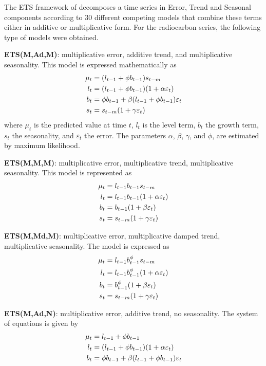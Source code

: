 \documentclass[draft,grl]{agutexSI}
\begin{document}
\begin{article}


The ETS framework of \citet{Hyndman2008} decomposes a time series in Error, Trend and Seasonal components according to 30 different competing models that combine these terms either in additive or multiplicative form. For the radiocarbon series, the following type of models were obtained.

{\bf ETS(M,Ad,M)}: multiplicative error, additive trend, and multiplicative seasonality. This model is expressed mathematically as
\begin{align}
\mu_t &= (l_{t-1} + \phi b_{t-1}) s_{t-m} \notag \\
l_t &= (l_{t-1} + \phi b_{t-1}) (1+ \alpha \varepsilon_t) \notag \\
b_t &= \phi b_{t-1} + \beta (l_{t-1} + \phi b_{t-1}) \varepsilon_t \notag \\
s_t &= s_{t-m} (1+ \gamma \varepsilon_t) \notag
\end{align}
where $\mu_t$ is the predicted value at time $t$, $l_t$ is the level term, $b_t$ the growth term, $s_t$ the seasonality, and $\varepsilon_t$ the error. The parameters $\alpha$, $\beta$, $\gamma$, and $\phi$, are estimated by maximum likelihood. 

{\bf ETS(M,M,M)}: multiplicative error, multiplicative trend, multiplicative seasonality. This model is represented as
\begin{align}
\mu_t &= l_{t-1} b_{t-1} s_{t-m} \notag \\
l_t &= l_{t-1} b_{t-1} (1+ \alpha \varepsilon_t) \notag \\
b_t &= b_{t-1} (1+ \beta \varepsilon_t) \notag \\
s_t &= s_{t-m} (1+ \gamma \varepsilon_t) \notag
\end{align}


{\bf ETS(M,Md,M)}: multiplicative error, multiplicative damped trend, multiplicative seasonality. The model is expressed as 
\begin{align}
\mu_t &= l_{t-1} b^{\phi}_{t-1} s_{t-m} \notag \\
l_t &= l_{t-1} b^{\phi}_{t-1} (1+ \alpha \varepsilon_t) \notag \\
b_t &=b^{\phi}_{t-1} (1+ \beta \varepsilon_t) \notag \\
s_t &= s_{t-m} (1+ \gamma \varepsilon_t) \notag
\end{align}

{\bf ETS(M,Ad,N)}: multiplicative error, additive trend, no seasonality. The system of equations is given by
\begin{align}
\mu_t &= l_{t-1} + \phi b_{t-1} \notag \\
l_t &= (l_{t-1} + \phi b_{t-1}) (1+ \alpha \varepsilon_t) \notag \\
b_t &= \phi b_{t-1} + \beta (l_{t-1} + \phi b_{t-1}) \varepsilon_t \notag
\end{align}


\end{article}
\end{document}
